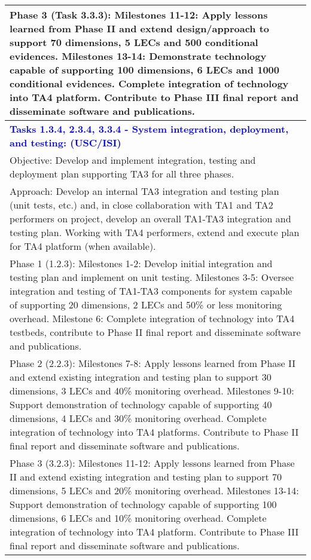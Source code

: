 {\begin{longtable} {|p{\textwidth} | }
Phase 3 (Task 3.3.3): Milestones 11-12: Apply lessons learned from Phase II and extend design/approach to support 70 dimensions, 5 LECs and 500 conditional evidences. Milestones 13-14: Demonstrate technology capable of supporting 100 dimensions, 6 LECs and 1000 conditional evidences. Complete integration of technology into TA4 platform. Contribute to Phase III final report and disseminate software and publications. \\ \hline
\textcolor{blue} {\footnotesize {\textbf{Tasks 1.3.4, 2.3.4, 3.3.4 - System integration, deployment, and testing: (USC/ISI)}} }\\ \hline
Objective: Develop and implement integration, testing and deployment plan supporting TA3 for all three phases. \\ \hline
Approach: Develop an internal TA3 integration and testing plan (unit tests, etc.) and, in close collaboration with TA1 and TA2 performers on project, develop an overall TA1-TA3 integration and testing plan.  Working with TA4 performers, extend and execute plan for TA4 platform (when available). \\ \hline
Phase 1 (1.2.3): Milestones 1-2:  Develop initial integration and testing plan and implement on unit testing.  Milestones 3-5:  Oversee integration and testing of TA1-TA3 components for system capable of supporting 20 dimensions, 2 LECs and 50\% or less monitoring overhead.   Milestone 6: Complete integration of technology into TA4 testbeds, contribute to Phase II final report and disseminate software and publications. \\ \hline
Phase 2 (2.2.3): Milestones 7-8:  Apply lessons learned from Phase II and extend existing integration and testing plan to support 30 dimensions, 3 LECs and 40\% monitoring overhead.  Milestones 9-10:  Support demonstration of technology capable of supporting 40 dimensions, 4 LECs and 30\% monitoring overhead.  Complete integration of technology into TA4 platforms.  Contribute to Phase II final report and disseminate software and publications. \\ \hline
Phase 3 (3.2.3): Milestones 11-12:  Apply lessons learned from Phase II and extend existing integration and testing plan to support 70 dimensions, 5 LECs and 20\% monitoring overhead.  Milestones 13-14:  Support demonstration of technology capable of supporting 100 dimensions, 6 LECs and 10\% monitoring overhead.  Complete integration of technology into TA4 platform.  Contribute to Phase III final report and disseminate software and publications. \\ \hline

\end{longtable}}
